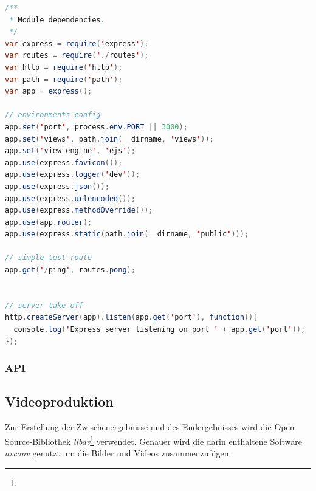 \begin{lstlisting}[label=minimal_node_http_server,language=Java, caption=Minimaler Node-HTTP-Server]
/**
 * Module dependencies.
 */
var express = require('express');
var routes = require('./routes');
var http = require('http');
var path = require('path');
var app = express();

// environments config
app.set('port', process.env.PORT || 3000);
app.set('views', path.join(__dirname, 'views'));
app.set('view engine', 'ejs');
app.use(express.favicon());
app.use(express.logger('dev'));
app.use(express.json());
app.use(express.urlencoded());
app.use(express.methodOverride());
app.use(app.router);
app.use(express.static(path.join(__dirname, 'public')));

// simple test route
app.get('/ping', routes.pong);


// server take off
http.createServer(app).listen(app.get('port'), function(){
  console.log('Express server listening on port ' + app.get('port'));
});
\end{lstlisting}


\subsubsection{API}

\subsection{Videoproduktion}

Zur Erstellung der Zwischenergebnisse und des Endergebnisses wird die Open Source-Bibliothek \emph{libav}\footnote{} verwendet. Genauer wird die darin enthaltene Software \emph{avconv} genutzt um die Bilder und Videos zusammenzufügen. 
